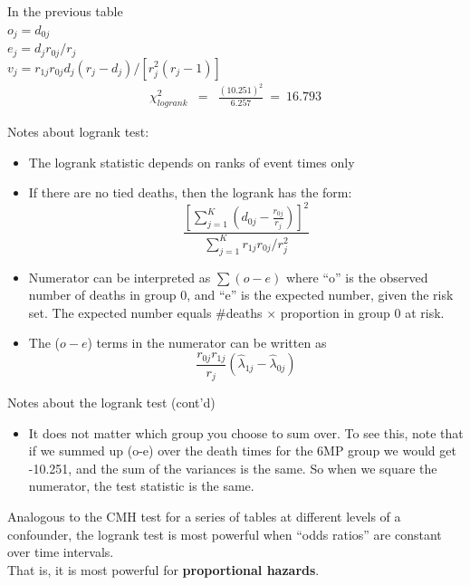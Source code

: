 \documentclass[envcountsect, 10pt, portrait, palatino]{beamer}
\begin{document}
\begin{frame}
In the previous table
\\[2ex]
$o_j = d_{0j}$\\[1ex]
$e_j = d_j r_{0j}/r_j$ \\[1ex]
$v_j = r_{1j} r_{0j} d_j (r_j-d_j)/[r_j^2(r_j-1)]$
\begin{eqnarray*}
\chi^2_{logrank} & = & \frac{(10.251)^2}{6.257} ~=~ 16.793
\end{eqnarray*}
\end{frame}
\begin{frame}{ Notes about logrank test:}
\begin{itemize}
\item The logrank statistic depends on ranks of event times only
\item If there are no tied deaths, then the logrank has the form:
\[    \frac{[\sum_{j=1}^K (d_{0j} - \frac{r_{0j}}{r_j})]^2}
        {\sum_{j=1}^K r_{1j}r_{0j}/r_j^2}  \]
\item  Numerator can be interpreted as $\sum (o-e)$ where
``o'' is the observed number of deaths in group 0, and
``e'' is the expected number, given the risk set.  The expected
number equals \#deaths $\times$ proportion in group 0
at risk.
\item  The ($o-e$) terms in the numerator  can be written as
\[   \frac{r_{0j}r_{1j}}{r_j}(\hat\lambda_{1j} - \hat\lambda_{0j} ) \]
\end{itemize}
\end{frame}
\begin{frame}{Notes about the logrank test (cont'd)}
\begin{itemize}
\item  It does not matter which group you choose to sum over.
 To see this, note that if we summed up (o-e) over the death
times for the 6MP group we would get -10.251, and the sum of the
variances is the same.  So when we square the numerator, the test
statistic is the same.
\end{itemize}
Analogous to the CMH test for a series of tables at
different levels of a confounder, the logrank test is most powerful when
``odds ratios'' are constant over time intervals.
\\[2ex]
That is, it is most powerful for {\bf proportional hazards}.
\end{frame}
\end{document}
